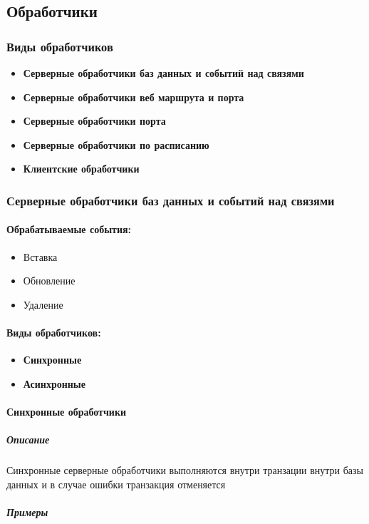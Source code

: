 \documentclass{article}
\begin{document}
\subsection{Обработчики}

\subsubsection{Виды обработчиков}
\begin{itemize}
  \item \textbf{Серверные обработчики баз данных и событий над связями}
  \item \textbf{Серверные обработчики веб маршрута и порта}
  \item \textbf{Серверные обработчики порта}
  \item \textbf{Серверные обработчики по расписанию}
  \item \textbf{Клиентские обработчики}
\end{itemize}

\subsubsection{Серверные обработчики баз данных и событий над связями}
\paragraph{Обрабатываемые события:}
\begin{itemize}
  \item Вставка
  \item Обновление
  \item Удаление
\end{itemize}
\paragraph{Виды обработчиков:}
\begin{itemize}
  \item \textbf{Синхронные}
  \item \textbf{Асинхронные}
\end{itemize}

\paragraph{Синхронные обработчики}
\subparagraph{Описание}

Синхронные серверные обработчики выполняются внутри транзации внутри базы
данных и в случае ошибки
транзакция отменяется
\subparagraph{Примеры}
\end{document}
